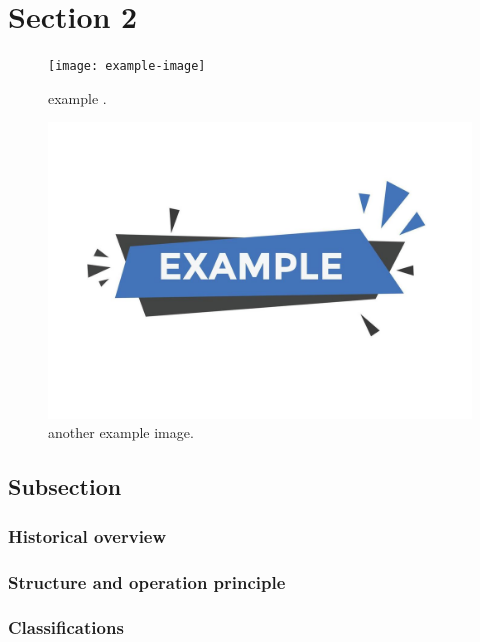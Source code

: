 \section{Section 2} 
\lipsum[1-3] 

		\begin{figure}[h!]
			\centering
			\texttt{[image: example-image]}
			\caption{example .}
			\label{fig1.3:}
			
		\end{figure}

		\begin{figure}[h!]
			\centering
			\includegraphics[width=\textwidth]{Figures/Ch1/example}
			\caption{another example image.}
			\label{fig1.4:}
		
		\end{figure}

	
	\subsection{Subsection } 
	
		\subsubsection{Historical overview  }

		\subsubsection{Structure and operation principle  }

		
	
		
		\subsubsection{Classifications}

